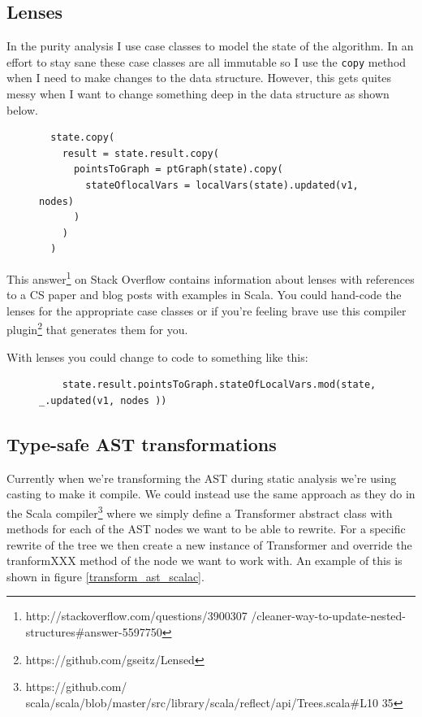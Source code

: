 \documentclass[11pt]{exam}
\begin{document}
\subsection{Lenses}

In the purity analysis I use case classes to model the state of the
algorithm. In an effort to stay sane these case classes are all
immutable so I use the \texttt{copy} method when I need to make
changes to the data structure. However, this gets quites messy when I
want to change something deep in the data structure as shown below.

\begin{figure}[h!]
  \begin{lstlisting}
  state.copy(
    result = state.result.copy(
      pointsToGraph = ptGraph(state).copy(
        stateOflocalVars = localVars(state).updated(v1, nodes)
      )
    )
  )
  \end{lstlisting}
\end{figure}

This answer\footnote{http://stackoverflow.com/questions/3900307
/cleaner-way-to-update-nested-structures\#answer-5597750}  on Stack
Overflow contains information about lenses with references to a CS
paper and blog posts with examples in Scala. You could hand-code the
lenses for the appropriate case classes or if you're feeling brave use
this compiler plugin\footnote{https://github.com/gseitz/Lensed} that
generates them for you. \newline

With lenses you could change to code to something like this:

\begin{figure}[h!]
  \begin{lstlisting}
    state.result.pointsToGraph.stateOfLocalVars.mod(state, _.updated(v1, nodes ))
  \end{lstlisting}
\end{figure}

\subsection{Type-safe AST transformations}

Currently when we're transforming the AST during static analysis we're
using casting to make it compile. We could instead use the same
approach as they do in the Scala compiler\footnote{https://github.com/
scala/scala/blob/master/src/library/scala/reflect/api/Trees.scala\#L10
35} where we simply define a Transformer abstract class with methods
for each of the AST nodes we want to be able to rewrite. For a
specific rewrite of the tree we then create a new instance of
Transformer and override the tranformXXX method of the node we want to
work with. An example of this is shown in figure
\ref{transform_ast_scalac}.
\end{document}
